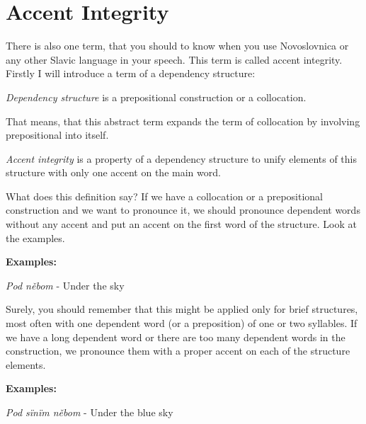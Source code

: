 \section{Accent Integrity}

There is also one term, that you should to know when you use Novoslovnica or any other Slavic language in your speech. This term is called accent integrity. Firstly I will introduce a term of a dependency structure:

\textit{Dependency structure} is a prepositional construction or a collocation.

That means, that this abstract term expands the term of collocation by involving prepositional into itself. 

\textit{Accent integrity} is a property of a dependency structure to unify elements of this structure with only one accent on the main word.

What does this definition say? If we have a collocation or a prepositional construction and we want to pronounce it, we should pronounce dependent words without any accent and put an accent on the first word of the structure. Look at the examples.

\textbf{Examples:}

\textit{Pod něbom}  - Under the sky

Surely, you should remember that this might be applied only for brief structures, most often with one dependent word (or a preposition) of one or two syllables. If we have a long dependent word or there are too many dependent words in the construction, we pronounce them with a proper accent on each of the structure elements.

\textbf{Examples:}

\textit{Pod sïnïm něbom}  - Under the blue sky

